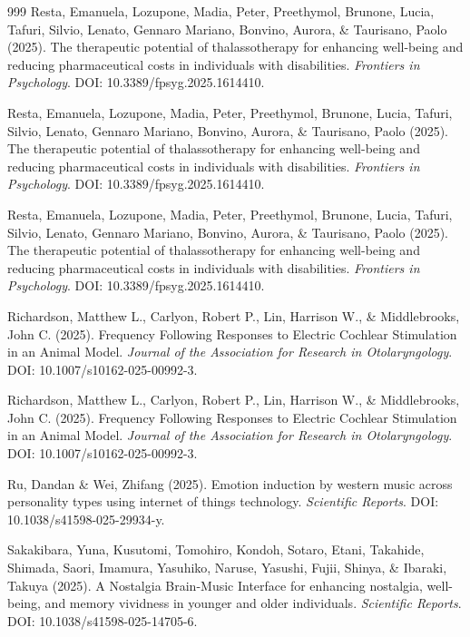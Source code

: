 \documentclass[9pt,onecolumn]{article}
\begin{document}
\begin{thebibliography}{999}
Resta, Emanuela, Lozupone, Madia, Peter, Preethymol, Brunone, Lucia, Tafuri, Silvio, Lenato, Gennaro Mariano, Bonvino, Aurora, \& Taurisano, Paolo (2025). The therapeutic potential of thalassotherapy for enhancing well-being and reducing pharmaceutical costs in individuals with disabilities. \textit{Frontiers in Psychology}. DOI: 10.3389/fpsyg.2025.1614410.

Resta, Emanuela, Lozupone, Madia, Peter, Preethymol, Brunone, Lucia, Tafuri, Silvio, Lenato, Gennaro Mariano, Bonvino, Aurora, \& Taurisano, Paolo (2025). The therapeutic potential of thalassotherapy for enhancing well-being and reducing pharmaceutical costs in individuals with disabilities. \textit{Frontiers in Psychology}. DOI: 10.3389/fpsyg.2025.1614410.

Resta, Emanuela, Lozupone, Madia, Peter, Preethymol, Brunone, Lucia, Tafuri, Silvio, Lenato, Gennaro Mariano, Bonvino, Aurora, \& Taurisano, Paolo (2025). The therapeutic potential of thalassotherapy for enhancing well-being and reducing pharmaceutical costs in individuals with disabilities. \textit{Frontiers in Psychology}. DOI: 10.3389/fpsyg.2025.1614410.

Richardson, Matthew L., Carlyon, Robert P., Lin, Harrison W., \& Middlebrooks, John C. (2025). Frequency Following Responses to Electric Cochlear Stimulation in an Animal Model. \textit{Journal of the Association for Research in Otolaryngology}. DOI: 10.1007/s10162-025-00992-3.

Richardson, Matthew L., Carlyon, Robert P., Lin, Harrison W., \& Middlebrooks, John C. (2025). Frequency Following Responses to Electric Cochlear Stimulation in an Animal Model. \textit{Journal of the Association for Research in Otolaryngology}. DOI: 10.1007/s10162-025-00992-3.

Ru, Dandan \& Wei, Zhifang (2025). Emotion induction by western music across personality types using internet of things technology. \textit{Scientific Reports}. DOI: 10.1038/s41598-025-29934-y.

Sakakibara, Yuna, Kusutomi, Tomohiro, Kondoh, Sotaro, Etani, Takahide, Shimada, Saori, Imamura, Yasuhiko, Naruse, Yasushi, Fujii, Shinya, \& Ibaraki, Takuya (2025). A Nostalgia Brain-Music Interface for enhancing nostalgia, well-being, and memory vividness in younger and older individuals. \textit{Scientific Reports}. DOI: 10.1038/s41598-025-14705-6.


\end{thebibliography}
\end{document}
